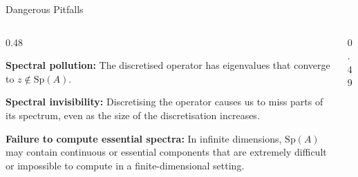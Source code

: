 \documentclass[aspectratio=169]{beamer}
\begin{document}
\begin{frame}{Dangerous Pitfalls}

    

\begin{columns}[T,onlytextwidth]

\begin{column}{0.48\textwidth}
\small

\textbf{Spectral pollution:}  
The discretised operator has eigenvalues that converge to $z \notin \text{Sp}(A).$

\vspace{2em}

\textbf{Spectral invisibility:}  
Discretising the operator causes us to miss parts of its spectrum,
even as the size of the discretisation increases.


\vspace{2em}

\textbf{Failure to compute essential spectra:}  
In infinite dimensions, $\text{Sp}(A)$ may contain continuous or essential components that are extremely difficult or impossible to compute in a finite-dimensional setting.

\end{column}

\begin{column}{0.49\textwidth}
\centering
{}
\end{column}
\end{columns}
\end{frame}
\end{document}
